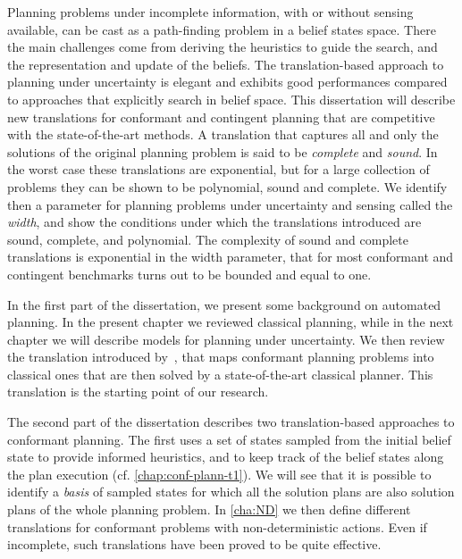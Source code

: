 Planning problems under incomplete information, with or without sensing available,
can be cast as a path-finding problem in a belief states space. There the main
challenges come from deriving the heuristics to guide the search, and the representation and
update of the beliefs.
The translation-based approach to planning under uncertainty is elegant and exhibits
good performances compared to approaches that explicitly search in belief space.
This dissertation will describe new translations for conformant and contingent planning that are competitive with the state-of-the-art methods.
A translation that captures all and only the solutions of the original planning problem is said to be \emph{complete} and \emph{sound}.  In the worst case these translations are exponential, but for a large collection of problems they can be shown to be polynomial, sound and complete. 
We identify then a parameter for planning problems under uncertainty and sensing called the \emph{width}, and show the conditions under which the translations introduced are sound, complete, and polynomial. The complexity of sound and complete translations is exponential in the width parameter, that for most conformant and contingent benchmarks turns out to be bounded and equal to one.


In the first part of the dissertation, we present some background on automated planning. In the present chapter we reviewed
classical planning, while in the next chapter we will describe models for planning under uncertainty.
We then review the translation introduced by~\citet{palacios:jair09}, that maps conformant planning problems into classical ones that are then solved by a state-of-the-art classical planner. This translation is the starting point of our research. 


The second part of the dissertation describes two translation-based approaches to conformant planning.
The first uses a set of states sampled from the initial belief state to provide informed heuristics, and to 
keep track of the belief states along the plan execution (cf. \autoref{chap:conf-plann-t1}). We will see that it is possible to identify a \emph{basis}
of sampled states for which all the solution plans are also solution plans of the whole planning problem.
In \autoref{cha:ND} we then define different translations for conformant problems with non-deterministic actions.
Even if incomplete, such translations have been proved to be quite effective.

